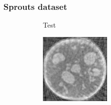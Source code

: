 \documentclass[journal]{IEEEtran}
\begin{document}
\subsubsection{\textbf{Sprouts dataset}}
\label{Sec:sprouts_spatially_varying}
\begin{figure}[!h]
    \begin{subfigure}[b]{0.29\linewidth}
        \caption{Test}
     \end{subfigure}
\quad
    \begin{subfigure}[b]{0.3\linewidth}
        \includegraphics[width=\textwidth]{../images/sprouts/fdkIm.png}

\end{subfigure}
\end{figure}
\end{document}
